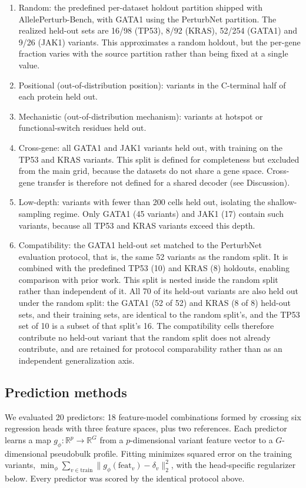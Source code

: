 \documentclass[11pt,letterpaper]{article}
\begin{document}
\begin{enumerate}[label=\arabic*.,leftmargin=2em,itemsep=2pt]
\item Random: the predefined per-dataset holdout partition shipped with AllelePerturb-Bench, with GATA1 using the PerturbNet partition. The realized held-out sets are 16/98 (TP53), 8/92 (KRAS), 52/254 (GATA1) and 9/26 (JAK1) variants. This approximates a random holdout, but the per-gene fraction varies with the source partition rather than being fixed at a single value.
\item Positional (out-of-distribution position): variants in the C-terminal half of each protein held out.
\item Mechanistic (out-of-distribution mechanism): variants at hotspot or functional-switch residues held out.
\item Cross-gene: all GATA1 and JAK1 variants held out, with training on the TP53 and KRAS variants. This split is defined for completeness but excluded from the main grid, because the datasets do not share a gene space. Cross-gene transfer is therefore not defined for a shared decoder (see Discussion).
\item Low-depth: variants with fewer than 200 cells held out, isolating the shallow-sampling regime. Only GATA1 (45 variants) and JAK1 (17) contain such variants, because all TP53 and KRAS variants exceed this depth.
\item Compatibility: the GATA1 held-out set matched to the PerturbNet evaluation protocol, that is, the same 52 variants as the random split. It is combined with the predefined TP53 (10) and KRAS (8) holdouts, enabling comparison with prior work. This split is nested inside the random split rather than independent of it. All 70 of its held-out variants are also held out under the random split: the GATA1 (52 of 52) and KRAS (8 of 8) held-out sets, and their training sets, are identical to the random split's, and the TP53 set of 10 is a subset of that split's 16. The compatibility cells therefore contribute no held-out variant that the random split does not already contribute, and are retained for protocol comparability rather than as an independent generalization axis.
\end{enumerate}

\subsection*{Prediction methods}

We evaluated 20 predictors: 18 feature-model combinations formed by crossing six regression heads with three feature spaces, plus two references. Each predictor learns a map $g_\phi: \mathbb{R}^{p} \to \mathbb{R}^{G}$ from a $p$-dimensional variant feature vector to a $G$-dimensional pseudobulk profile. Fitting minimizes squared error on the training variants, $\min_{\phi} \sum_{v \in \mathrm{train}} \lVert g_\phi(\mathrm{feat}_v) - \delta_v\rVert_2^2$, with the head-specific regularizer below. Every predictor was scored by the identical protocol above.
\end{document}
